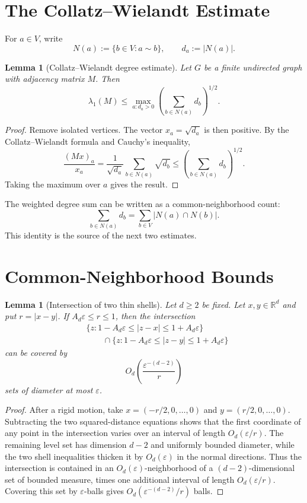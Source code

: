 \documentclass[11pt]{article}
\newtheorem{lemma}[theorem]{Lemma}
\newcommand{\R}{\mathbb R}
\newcommand{\eps}{\varepsilon}
\begin{document}
\section{The Collatz--Wielandt Estimate}

For $a\in V$, write
\[
   N(a):=\{b\in V:a\sim b\},
   \qquad
   d_a:=|N(a)|.
\]

\begin{lemma}[Collatz--Wielandt degree estimate]\label{lem:CW}
Let $G$ be a finite undirected graph with adjacency matrix $M$.  Then
\[
   \lambda_1(M)
   \le
   \max_{a:d_a>0}\left(\sum_{b\in N(a)}d_b\right)^{1/2}.
\]
\end{lemma}

\smallskip
\begin{proof}
Remove isolated vertices.  The vector $x_a=\sqrt{d_a}$ is then positive.  By the Collatz--Wielandt formula \cite{Collatz1942} and Cauchy's inequality,
\[
   \frac{(Mx)_a}{x_a}
   =
   \frac1{\sqrt{d_a}}\sum_{b\in N(a)}\sqrt{d_b}
   \le
   \left(\sum_{b\in N(a)}d_b\right)^{1/2}.
\]
Taking the maximum over $a$ gives the result.
\end{proof}

\smallskip
\noindent
The weighted degree sum can be written as a common-neighborhood count:
\[
   \sum_{b\in N(a)}d_b
   =
   \sum_{b\in V}|N(a)\cap N(b)|.
\]
This identity is the source of the next two estimates.

\section{Common-Neighborhood Bounds}

\begin{lemma}[Intersection of two thin shells]\label{lem:shell}
Let $d\ge2$ be fixed.  Let $x,y\in\R^d$ and put $r=|x-y|$.  If $A_d\eps\le r\le1$, then the intersection
\[
\begin{aligned}
   &\{z:1-A_d\eps\le |z-x|\le1+A_d\eps\} \\
   &\qquad\cap
   \{z:1-A_d\eps\le |z-y|\le1+A_d\eps\}
\end{aligned}
\]
can be covered by
\[
   O_d\!\left(\frac{\eps^{-(d-2)}}{r}\right)
\]
sets of diameter at most $\eps$.
\end{lemma}

\smallskip
\begin{proof}
After a rigid motion, take $x=(-r/2,0,\ldots,0)$ and $y=(r/2,0,\ldots,0)$.  Subtracting the two squared-distance equations shows that the first coordinate of any point in the intersection varies over an interval of length $O_d(\eps/r)$.  The remaining level set has dimension $d-2$ and uniformly bounded diameter, while the two shell inequalities thicken it by $O_d(\eps)$ in the normal directions.  Thus the intersection is contained in an $O_d(\eps)$-neighborhood of a $(d-2)$-dimensional set of bounded measure, times one additional interval of length $O_d(\eps/r)$.  Covering this set by $\eps$-balls gives $O_d(\eps^{-(d-2)}/r)$ balls.
\end{proof}
\end{document}
